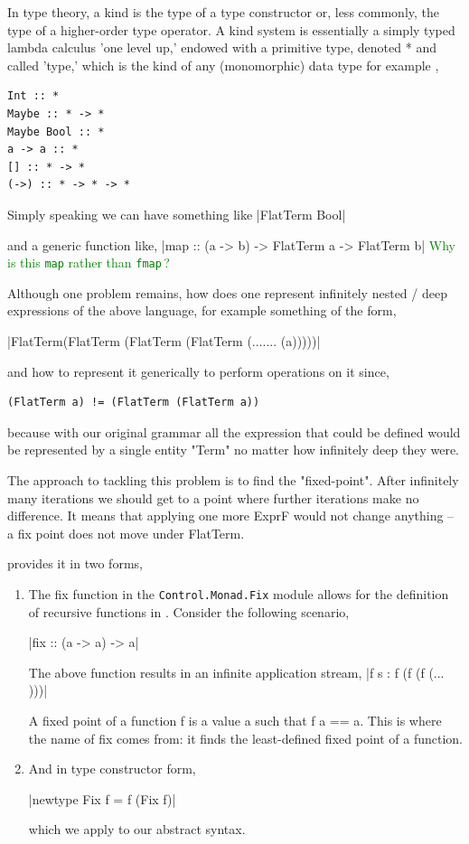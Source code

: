 \documentclass[thesis-solanki.tex]{subfiles}
\begin{document}
In type theory, a kind is the type of a type constructor or, less commonly, the type of a higher-order type operator. A kind system is
essentially a simply typed lambda calculus 'one level up,' endowed with a primitive type, denoted * and called 'type,' which is the kind of
any (monomorphic) data type for example \cite{website:kindhaskellwiki},

\begin{verbatim}
Int :: *
Maybe :: * -> *
Maybe Bool :: *
a -> a :: *
[] :: * -> *
(->) :: * -> * -> *
\end{verbatim}

Simply speaking we can have something like
|FlatTerm Bool|

and a generic function like,
|map :: (a -> b) -> FlatTerm a -> FlatTerm b|
\textcolor{green}{%
  Why is this {\color{blue}\Verb|map|} rather than {\color{blue}\Verb|fmap|}\,?
}

Although one problem remains, how does one represent infinitely nested / deep expressions of the above language, for example something of
the form,

|FlatTerm(FlatTerm (FlatTerm (FlatTerm (....... (a)))))|

and how to represent it generically to perform operations on it since,
\begin{verbatim}
(FlatTerm a) != (FlatTerm (FlatTerm a))
\end{verbatim}
%
because with our original grammar all the expression that could be defined would be represented by a single entity "Term" no matter how
infinitely deep they were.

The approach to tackling this problem is to find the "fixed-point".
After infinitely many iterations we should get to a  point where further iterations make no
difference.
It means that applying one more ExprF would not change anything – a fix point does not move under FlatTerm.

 provides it in two forms,
\begin{enumerate}

\item The fix function in the \texttt{Control.Monad.Fix} module allows for the definition of recursive functions in . Consider the following scenario,

|fix :: (a -> a) -> a|

The above function results in an infinite application stream,
|f s : f (f (f (... )))|

A fixed point of a function f is a value a such that f a == a. This is where the name of fix comes from: it finds the least-defined fixed
point of a function.

\item And in type constructor form,

|newtype Fix f = f (Fix f)|

which we apply to our abstract syntax.

\end{enumerate}
\end{document}
